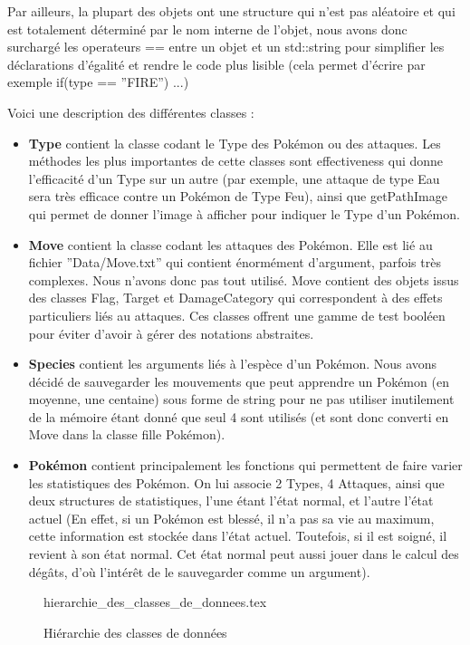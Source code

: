 \documentclass[a4paper,twoside, openany,11pt]{book}
\begin{document}
Par ailleurs, la plupart des objets ont une structure qui n'est pas aléatoire et qui est totalement déterminé par le nom interne de l'objet, nous avons donc surchargé les operateurs == entre un objet et un std::string pour simplifier les déclarations d'égalité et rendre le code plus lisible (cela permet d'écrire par exemple if(type == ''FIRE'') ...)

Voici une description des différentes classes :

\begin{itemize}
\item \textbf{Type} contient la classe codant le Type des Pokémon ou des attaques. Les méthodes les plus importantes de cette classes sont effectiveness qui donne l'efficacité d'un Type sur un autre (par exemple, une attaque de type Eau sera très efficace contre un Pokémon de Type Feu), ainsi que getPathImage qui permet de donner l'image à afficher pour indiquer le Type d'un Pokémon.
\item \textbf{Move} contient la classe codant les attaques des Pokémon. Elle est lié au fichier ''Data/Move.txt'' qui contient énormément d'argument, parfois très complexes. Nous n'avons donc pas tout utilisé. Move contient des objets issus des classes Flag, Target et DamageCategory qui correspondent à des effets particuliers liés au attaques. Ces classes offrent une gamme de test booléen pour éviter d'avoir à gérer des notations abstraites. 
\item  \textbf{Species} contient les arguments liés à l'espèce d'un Pokémon. Nous avons décidé de sauvegarder les mouvements que peut apprendre un Pokémon (en moyenne, une centaine) sous forme de string pour ne pas utiliser inutilement de la mémoire étant donné que seul 4 sont utilisés (et sont donc converti en Move dans la classe fille Pokémon). 
\item  \textbf{Pokémon} contient principalement les fonctions qui permettent de faire varier les statistiques des Pokémon. On lui associe 2 Types, 4 Attaques, ainsi que deux structures de statistiques, l'une étant l'état normal, et l'autre l'état actuel (En effet, si un Pokémon est blessé, il n'a pas sa vie au maximum, cette information est stockée dans l'état actuel. Toutefois, si il est soigné, il revient à son état normal. Cet état normal peut aussi jouer dans le calcul des dégâts, d'où l’intérêt de le sauvegarder comme un argument). 
\end{itemize}

\begin{figure}[!h]\centering
{hierarchie_des_classes_de_donnees.tex}
\caption{Hiérarchie des classes de données}
\end{figure}
\end{document}
